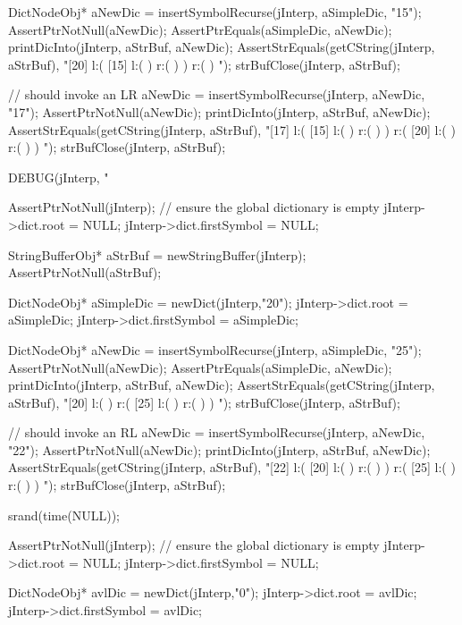   DictNodeObj* aNewDic = insertSymbolRecurse(jInterp, aSimpleDic, "15");
  AssertPtrNotNull(aNewDic);
  AssertPtrEquals(aSimpleDic, aNewDic);
  printDicInto(jInterp, aStrBuf, aNewDic);
  AssertStrEquals(getCString(jInterp, aStrBuf),
  "[20] l:( [15] l:(  ) r:(  )  ) r:(  ) ");
  strBufClose(jInterp, aStrBuf);
  
  // should invoke an LR
  aNewDic = insertSymbolRecurse(jInterp, aNewDic, "17");
  AssertPtrNotNull(aNewDic);
  printDicInto(jInterp, aStrBuf, aNewDic);
  AssertStrEquals(getCString(jInterp, aStrBuf),
  "[17] l:( [15] l:(  ) r:(  )  ) r:( [20] l:(  ) r:(  )  ) ");
  strBufClose(jInterp, aStrBuf);
\stopCTest
\stopTestCase


\startCTest
  DEBUG(jInterp, "\n%

  AssertPtrNotNull(jInterp);
  // ensure the global dictionary is empty
  jInterp->dict.root        = NULL;
  jInterp->dict.firstSymbol = NULL;

  StringBufferObj* aStrBuf = newStringBuffer(jInterp);
  AssertPtrNotNull(aStrBuf);
  
  DictNodeObj* aSimpleDic = newDict(jInterp,"20");
  jInterp->dict.root        = aSimpleDic;
  jInterp->dict.firstSymbol = aSimpleDic;

  DictNodeObj* aNewDic = insertSymbolRecurse(jInterp, aSimpleDic, "25");
  AssertPtrNotNull(aNewDic);
  AssertPtrEquals(aSimpleDic, aNewDic);
  printDicInto(jInterp, aStrBuf, aNewDic);
  AssertStrEquals(getCString(jInterp, aStrBuf),
  "[20] l:(  ) r:( [25] l:(  ) r:(  )  ) ");
  strBufClose(jInterp, aStrBuf);
  
  // should invoke an RL
  aNewDic = insertSymbolRecurse(jInterp, aNewDic, "22");
  AssertPtrNotNull(aNewDic);
  printDicInto(jInterp, aStrBuf, aNewDic);
  AssertStrEquals(getCString(jInterp, aStrBuf),
  "[22] l:( [20] l:(  ) r:(  )  ) r:( [25] l:(  ) r:(  )  ) ");
  strBufClose(jInterp, aStrBuf);
\stopCTest
\stopTestCase

\startCTest

  srand(time(NULL));

  AssertPtrNotNull(jInterp);
  // ensure the global dictionary is empty
  jInterp->dict.root        = NULL;
  jInterp->dict.firstSymbol = NULL;

  DictNodeObj* avlDic = newDict(jInterp,"0");
  jInterp->dict.root        = avlDic;
  jInterp->dict.firstSymbol = avlDic;

